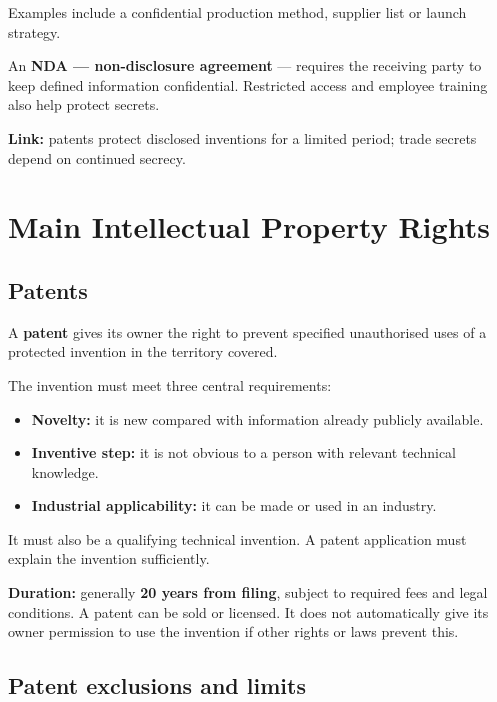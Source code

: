 \documentclass[12pt,a4paper]{report}
\newcommand{\tightlist}{}
\begin{document}
Examples include a confidential production method, supplier list or launch strategy.

An \textbf{NDA --- non-disclosure agreement} --- requires the receiving party to keep defined information confidential. Restricted access and employee training also help protect secrets.

\textbf{Link:} patents protect disclosed inventions for a limited period; trade secrets depend on continued secrecy.

\hypertarget{main-intellectual-property-rights}{%
\section{Main Intellectual Property Rights}\label{main-intellectual-property-rights}}

\hypertarget{patents}{%
\subsection{Patents}\label{patents}}

A \textbf{patent} gives its owner the right to prevent specified unauthorised uses of a protected invention in the territory covered.

The invention must meet three central requirements:

\begin{itemize}
\tightlist
\item
  \textbf{Novelty:} it is new compared with information already publicly available.
\item
  \textbf{Inventive step:} it is not obvious to a person with relevant technical knowledge.
\item
  \textbf{Industrial applicability:} it can be made or used in an industry.
\end{itemize}

It must also be a qualifying technical invention. A patent application must explain the invention sufficiently.

\textbf{Duration:} generally \textbf{20 years from filing}, subject to required fees and legal conditions. A patent can be sold or licensed. It does not automatically give its owner permission to use the invention if other rights or laws prevent this.

\hypertarget{patent-exclusions-and-limits}{%
\subsection{Patent exclusions and limits}\label{patent-exclusions-and-limits}}
\end{document}
